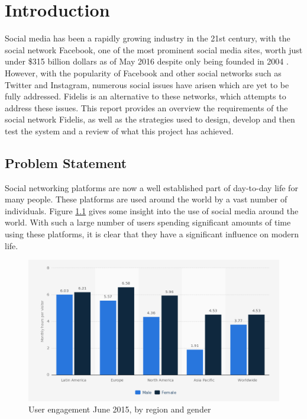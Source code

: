 \chapter{Introduction}
\label{Chapter:Introduction}

Social media has been a rapidly growing industry in the 21st century, with the social network Facebook, one of the most prominent social media sites, worth just under \$315 billion dollars as of May 2016 despite only being founded in 2004 \cite{Forbes:Facebook}. However, with the popularity of Facebook and other social networks such as Twitter and Instagram, numerous social issues have arisen which are yet to be fully addressed. Fidelis is an alternative to these networks, which attempts to address these issues. This report provides an overview the requirements of the social network Fidelis, as well as the strategies used to design, develop and then test the system and a review of what this project has achieved.

\section{Problem Statement}
\label{Section:ProblemStatement}
Social networking platforms are now a well established part of day-to-day life for many people. These platforms are used around the world by a vast number of individuals. Figure \ref{fig:SocialMediaRegionGender} gives some insight into the use of social media around the world. With such a large number of users spending significant amounts of time using these platforms, it is clear that they have a significant influence on modern life.

\begin{figure}[H]
  \centering
  \includegraphics[width=1.0\textwidth]{Images/Introduction/SocialMediaRegionGender}
  \caption{User engagement June 2015, by region and gender \cite{Statista:SocialMediaRegionGender}} \label{fig:SocialMediaRegionGender} 
\end{figure}

